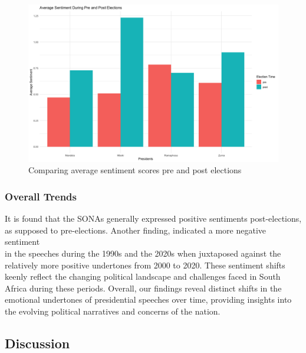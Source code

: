\documentclass[
  letterpaper,
  DIV=11,
  numbers=noendperiod]{scrartcl}
\begin{document}
\begin{figure}

{\centering \includegraphics{docs/Pre_post_elections.png}

}

\caption{Comparing average sentiment scores pre and post elections}

\end{figure}

\hypertarget{overall-trends}{%
\subsubsection{Overall Trends}\label{overall-trends}}

It is found that the SONA\textquotesingle s generally expressed positive
sentiments post-elections,\\
as supposed to pre-elections. Another finding, indicated a more negative
sentiment\\
in the speeches during the 1990s and the 2020s when juxtaposed against
the relatively more positive undertones from 2000 to 2020. These
sentiment shifts keenly reflect the changing political landscape and
challenges faced in South Africa during these periods. Overall, our
findings reveal distinct shifts in the emotional undertones of
presidential speeches over time, providing insights into the evolving
political narratives and concerns of the nation.

\hypertarget{discussion}{%
\subsection{Discussion}\label{discussion}}
\end{document}
